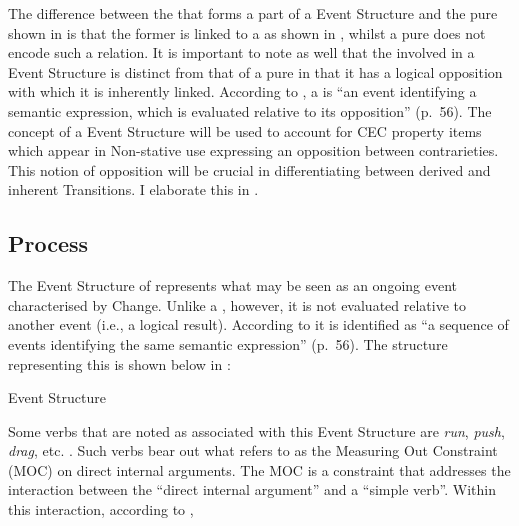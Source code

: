 The difference between the  that forms a part of a 
Event Structure and the pure  shown in  is that the
former is linked to a  as shown in , whilst a pure
 does not encode such a relation.  It is important to note as
well that the  involved in a  Event Structure is
distinct from that of a pure  in that it has a logical
opposition with which it is inherently linked.  According to
\citet{Pustejovsky1991}, a  is ``an event identifying a
semantic expression, which is evaluated relative to its opposition”
(p.~56).  The concept of a  Event
Structure will be used to account for CEC property items which appear
in Non-stative use expressing an opposition between contrarieties.
This notion of opposition will be crucial in differentiating between
derived and inherent Transitions.  I elaborate this in
.

\subsection{Process}\label{sec:4.2.4}

The Event Structure of  represents what may be seen as an
ongoing event characterised by Change.  Unlike a , however,
it is not evaluated relative to another event (i.e.,  a logical
result).  According to \citet{Pustejovsky1991} it is identified as ``a
sequence of events identifying the same semantic expression” (p.~56).
The structure representing this is shown below in :


\ea%
\label{ex:4:8}
 Event Structure \citep[56]{Pustejovsky1991}
\begin{center}\fbox{\parbox{5cm}{\centering
\begin{forest}
[P
  [e$_1$,no edge]
  [~~~...~~~,roof]
  [e$_n$, no edge]
]
\end{forest}
}}\end{center}
\z

Some verbs that are noted as associated with this Event Structure are
\textit{run}, \textit{push}, \textit{drag}, etc. \citep[56]{Pustejovsky1991}.  
Such verbs bear out what \citet{Tenny1994} refers to as the Measuring Out
Constraint (MOC) on direct internal arguments.  The MOC is a
constraint that addresses the interaction between the ``direct internal
argument” and a ``simple verb”. Within this interaction, according to
\citet{Tenny1994},

